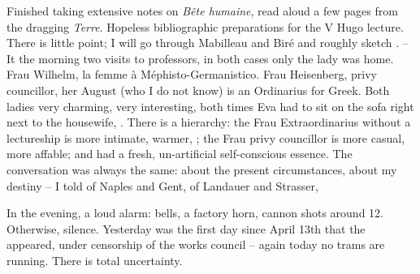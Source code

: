 
Finished taking extensive notes on \textit{Bête humaine}, read aloud a few pages from the dragging \textit{Terre}. Hopeless bibliographic preparations for the V Hugo lecture. There is little point; I will go through Mabilleau and Biré and roughly sketch . -- It the morning two visits to professors, in both cases only the lady was home. Frau Wilhelm, la femme à Méphisto-Germanistico. Frau Heisenberg, privy councillor, her August (who I do not know) is an Ordinarius for Greek. Both ladies very charming, very interesting, both times Eva had to sit on the sofa right next to the housewife, . There is a hierarchy: the Frau Extraordinarius without a lectureship is more intimate, warmer, ; the Frau privy councillor is more casual, more affable;  and had a fresh, un-artificial self-conscious essence. The conversation was always the same: about the present circumstances, about my destiny -- I told of Naples and Gent, of Landauer and Strasser,

In the evening, a loud alarm: bells, a factory horn, cannon shots around 12. Otherwise, silence. Yesterday was the first day since April 13th that the  appeared, under censorship of the works council -- again today no trams are running. There is total uncertainty.
%